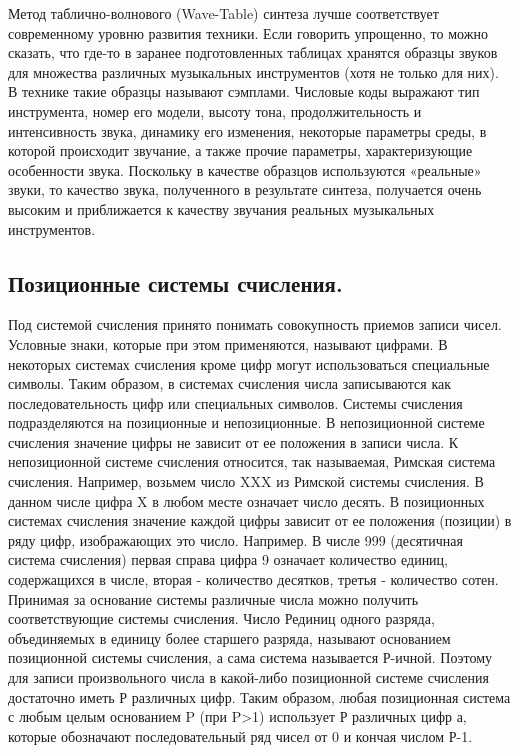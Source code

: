 \documentclass[a4paper]{article}
\begin{document}
Метод таблично-волнового (Wave-Table) синтеза лучше соответствует современному уровню развития техники. Если говорить упрощенно, то можно сказать, что где-то в заранее подготовленных таблицах хранятся образцы звуков для множества различных музыкальных инструментов (хотя не только для них). В технике такие образцы
называют сэмплами. Числовые коды выражают тип инструмента, номер его модели, высоту тона, продолжительность и интенсивность звука, динамику его изменения, некоторые параметры среды, в которой происходит звучание, а также прочие параметры, характеризующие особенности звука. Поскольку в качестве образцов используются «реальные» звуки, то качество звука, полученного в результате синтеза, получается очень высоким и приближается к качеству звучания реальных музыкальных инструментов.




\subsection{Позиционные системы счисления.}

Под системой счисления принято понимать совокупность приемов записи чисел. Условные знаки, которые при этом применяются, называют цифрами. В некоторых системах счисления кроме цифр могут использоваться специальные символы. Таким образом, в системах счисления числа записываются как последовательность цифр или специальных символов. Системы счисления подразделяются на позиционные и непозиционные. В непозиционной системе счисления значение цифры не зависит от ее положения в записи числа. К непозиционной системе счисления относится, так называемая, Римская система счисления. Например, возьмем число XXX из Римской системы счисления. В данном числе цифра X в любом месте означает число десять. В позиционных системах счисления значение каждой цифры зависит от ее положения (позиции) в ряду цифр, изображающих это число. Например. В числе 999 (десятичная система счисления) первая справа цифра 9 означает количество единиц, содержащихся в числе, вторая - количество десятков, третья - количество сотен. Принимая за основание системы различные числа можно получить соответствующие системы счисления. Число Рединиц одного разряда, объединяемых в единицу более старшего разряда, называют основанием позиционной системы счисления, а сама система называется Р-ичной. Поэтому для записи произвольного числа в какой-либо позиционной системе счисления достаточно иметь Р различных цифр. Таким образом, любая позиционная система с любым целым основанием P (при P>1) использует Р различных цифр а, которые обозначают последовательный ряд чисел от 0 и кончая числом Р-1.
\end{document}
